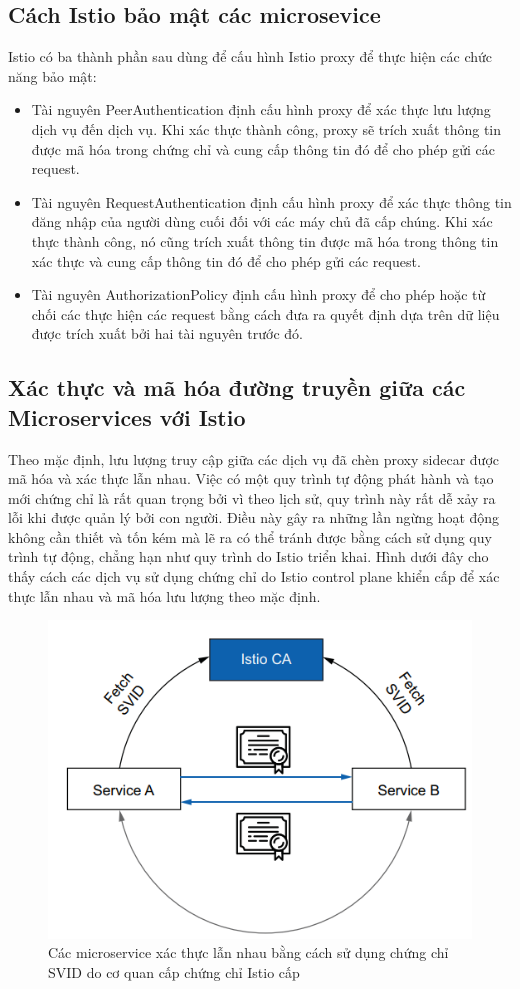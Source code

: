 \documentclass[12pt,a4paper]{report}
\begin{document}
{{		\subsection{Cách Istio bảo mật các microsevice}
			{\hspace{0.6cm}Istio có ba thành phần sau dùng để cấu hình Istio proxy để thực hiện các chức năng bảo mật:}
			\begin{itemize}
				\item Tài nguyên PeerAuthentication định cấu hình proxy để xác thực lưu lượng dịch vụ đến dịch vụ. Khi xác thực thành công, proxy sẽ trích xuất thông tin được mã hóa trong chứng chỉ và cung cấp thông tin đó để cho phép gửi các request.
				\item Tài nguyên RequestAuthentication định cấu hình proxy để xác thực thông tin đăng nhập của người dùng cuối đối với các máy chủ đã cấp chúng. Khi xác thực thành công, nó cũng trích xuất thông tin được mã hóa trong thông tin xác thực và cung cấp thông tin đó để cho phép gửi các request.
				\item Tài nguyên AuthorizationPolicy định cấu hình proxy để cho phép hoặc từ chối các thực hiện các request bằng cách đưa ra quyết định dựa trên dữ liệu được trích xuất bởi hai tài nguyên trước đó.
			\end{itemize}
		
		\subsection{Xác thực và mã hóa đường truyền giữa các Microservices với Istio}
			{\hspace{0.6cm}Theo mặc định, lưu lượng truy cập giữa các dịch vụ đã chèn proxy sidecar được mã hóa và xác thực lẫn nhau. Việc có một quy trình tự động phát hành và tạo mới chứng chỉ là rất quan trọng bởi vì theo lịch sử, quy trình này rất dễ xảy ra lỗi khi được quản lý bởi con người. Điều này gây ra những lần ngừng hoạt động không cần thiết và tốn kém mà lẽ ra có thể tránh được bằng cách sử dụng quy trình tự động, chẳng hạn như quy trình do Istio triển khai. Hình dưới đây cho thấy cách các dịch vụ sử dụng chứng chỉ do Istio control plane khiển cấp để xác thực lẫn nhau và mã hóa lưu lượng theo mặc định.}
			
			\begin{figure}[h]
				\centering
				\includegraphics[width=0.7\linewidth]{Pics/2.4.3-p1}
				\caption{Các microservice xác thực lẫn nhau bằng cách sử dụng chứng chỉ SVID do cơ quan cấp chứng chỉ Istio cấp }
				\label{fig:2}
			\end{figure}
			
}}
\end{document}
